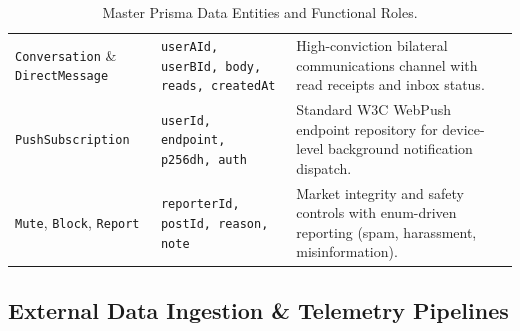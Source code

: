 \documentclass[11pt,a4paper]{article}
\begin{document}
\begin{table}[h!]
\begin{tabularx}{\textwidth}{l p{4.2cm} X}
\addlinespace
\texttt{Conversation} \& \texttt{DirectMessage} & \texttt{userAId, userBId, body, reads, createdAt} & High-conviction bilateral communications channel with read receipts and inbox status. \\
\addlinespace
\texttt{PushSubscription} & \texttt{userId, endpoint, p256dh, auth} & Standard W3C WebPush endpoint repository for device-level background notification dispatch. \\
\addlinespace
\texttt{Mute}, \texttt{Block}, \texttt{Report} & \texttt{reporterId, postId, reason, note} & Market integrity and safety controls with enum-driven reporting (spam, harassment, misinformation). \\
\bottomrule
\end{tabularx}
\caption{Master Prisma Data Entities and Functional Roles.}
\end{table}

\subsection{External Data Ingestion \& Telemetry Pipelines}
\end{document}
